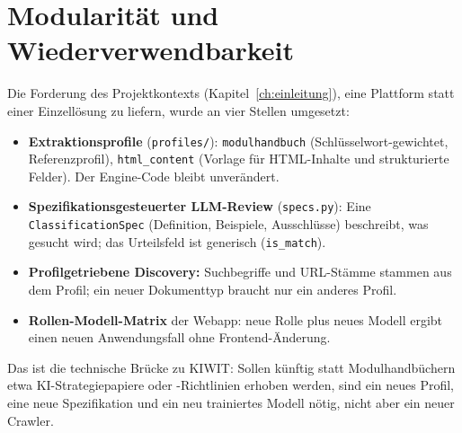 \section{Modularität und Wiederverwendbarkeit}
Die Forderung des Projektkontexts (Kapitel~\ref{ch:einleitung}), eine Plattform statt einer Einzellösung zu liefern, wurde an vier Stellen umgesetzt:
\begin{itemize}
  \item \textbf{Extraktionsprofile} (\texttt{profiles/}): \texttt{modulhandbuch} (Schlüsselwort-gewichtet, Referenzprofil), \texttt{html\_content} (Vorlage für HTML-Inhalte und strukturierte Felder). Der Engine-Code bleibt unverändert.
  \item \textbf{Spezifikationsgesteuerter LLM-Review} (\texttt{specs.py}): Eine \texttt{ClassificationSpec} (Definition, Beispiele, Ausschlüsse) beschreibt, was gesucht wird; das Urteilsfeld ist generisch (\texttt{is\_match}).
  \item \textbf{Profilgetriebene Discovery:} Suchbegriffe und URL-Stämme stammen aus dem Profil; ein neuer Dokumenttyp braucht nur ein anderes Profil.
  \item \textbf{Rollen-Modell-Matrix} der Webapp: neue Rolle plus neues Modell ergibt einen neuen Anwendungsfall ohne Frontend-Änderung.
\end{itemize}
Das ist die technische Brücke zu KIWIT: Sollen künftig statt Modulhandbüchern etwa KI-Strategiepapiere oder -Richtlinien erhoben werden, sind ein neues Profil, eine neue Spezifikation und ein neu trainiertes Modell nötig, nicht aber ein neuer Crawler.
